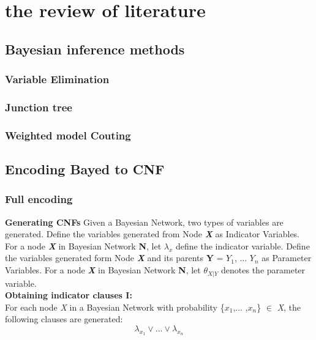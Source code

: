 \section{the review of literature}
    \subsection{Bayesian inference methods}
        \subsubsection{Variable Elimination}
        \subsubsection{Junction tree}
        \subsubsection{Weighted model Couting}
    \subsection{Encoding Bayed to CNF}
        \subsubsection{Full encoding}
            \textbf{Generating CNFs}
            \newline
            Given a Bayesian Network, two types of variables are generated.
            Define the variables generated from Node \textbf{\textit{X}} as Indicator Variables.
            For a node \textbf{\textit{X}} in Bayesian Network \textbf{N}, let $\lambda_x$ define the indicator variable. 
            Define the variables generated form Node \textbf{\textit{X}} and its parents \textbf{Y} = {$Y_{1}$, ... $Y_{n}$} as Parameter Variables.
            For a node \textbf{\textit{X}} in Bayesian Network \textbf{N}, let $\theta_{X|Y}$ denotes the parameter variable.\\
            
            \textbf{Obtaining indicator clauses \textsc{I}:}\\
            For each node \textit{X} in a Bayesian Network with probability \{$x_{1}$,... ,$x_{n}$\} $\in$ \textit{X}, the following clauses are generated:
            \begin{equation}\label{fullenc_ic1}
                \lambda_{x_{1}} \vee ... \vee \lambda_{x_{n}}
            \end{equation}
            
